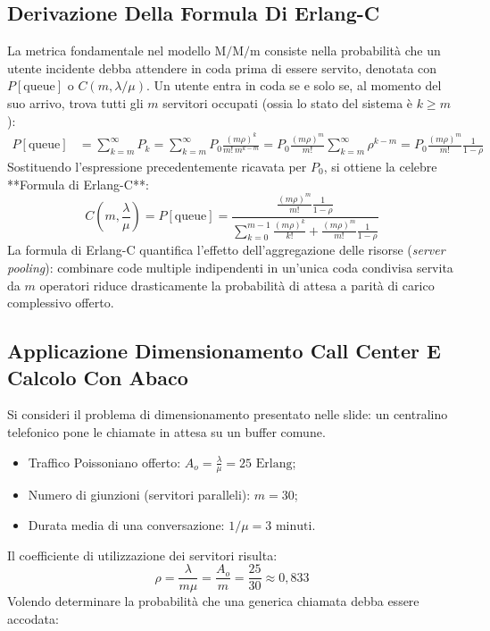 \documentclass[11pt, a4paper]{article}
\begin{document}
\subsection{Derivazione Della Formula Di Erlang-C}

La metrica fondamentale nel modello $\mathrm{M/M/m}$ consiste nella probabilità che un utente incidente debba attendere in coda prima di essere servito, denotata con $P[\text{queue}]$ o $C(m, \lambda/\mu)$. Un utente entra in coda se e solo se, al momento del suo arrivo, trova tutti gli $m$ servitori occupati (ossia lo stato del sistema è $k \ge m$):
\begin{align*}
P[\text{queue}] &= \sum_{k=m}^{\infty} P_k = \sum_{k=m}^{\infty} P_0 \frac{(m\rho)^k}{m! \, m^{k-m}} = P_0 \frac{(m\rho)^m}{m!} \sum_{k=m}^{\infty} \rho^{k-m} = P_0 \frac{(m\rho)^m}{m!} \frac{1}{1 - \rho}
\end{align*}
Sostituendo l'espressione precedentemente ricavata per $P_0$, si ottiene la celebre **Formula di Erlang-C**:
\[
\boxed{C\left(m, \frac{\lambda}{\mu}\right) = P[\text{queue}] = \frac{\frac{(m\rho)^m}{m!} \frac{1}{1 - \rho}}{\sum_{k=0}^{m-1} \frac{(m\rho)^k}{k!} + \frac{(m\rho)^m}{m!} \frac{1}{1 - \rho}}}
\]
La formula di Erlang-C quantifica l'effetto dell'aggregazione delle risorse (\emph{server pooling}): combinare code multiple indipendenti in un'unica coda condivisa servita da $m$ operatori riduce drasticamente la probabilità di attesa a parità di carico complessivo offerto.

\subsection{Applicazione Dimensionamento Call Center E Calcolo Con Abaco}

Si consideri il problema di dimensionamento presentato nelle slide: un centralino telefonico pone le chiamate in attesa su un buffer comune.
\begin{itemize}[noitemsep]
    \item Traffico Poissoniano offerto: $A_o = \frac{\lambda}{\mu} = 25\text{ Erlang}$;
    \item Numero di giunzioni (servitori paralleli): $m = 30$;
    \item Durata media di una conversazione: $1/\mu = 3\text{ minuti}$.
\end{itemize}
Il coefficiente di utilizzazione dei servitori risulta:
\[
\rho = \frac{\lambda}{m\mu} = \frac{A_o}{m} = \frac{25}{30} \approx 0{,}833
\]
Volendo determinare la probabilità che una generica chiamata debba essere accodata:
\end{document}
